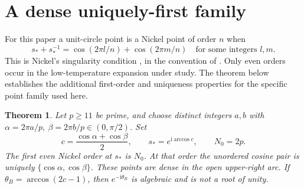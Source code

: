 \documentclass[11pt]{article}
\numberwithin{equation}{section}
\newtheorem{theorem}{Theorem}[section]
\theoremstyle{definition}
\newcommand{\ii}{\mathrm i}
\newcommand{\sstar}{s_*}
\begin{document}
\section{A dense uniquely-first family}
\label{sec:arithmetic}
For this paper a unit-circle point is a Nickel point of order \(n\)
when
\[
 s_*+s_*^{-1}
   =\cos(2\pi l/n)+\cos(2\pi m/n)
 \quad\text{for some integers }l,m.
\]
This is Nickel's singularity condition
\cite{Nickel1999,Nickel2000}, in the convention of \cite{TW2014}.
Only even orders occur in the low-temperature expansion under study.
The theorem below establishes the additional first-order and uniqueness
properties for the specific point family used here.
\begin{theorem}\label{thm:prime}
Let \(p\ge11\) be prime, and choose distinct integers \(a,b\) with
\(\alpha=2\pi a/p,\ \beta=2\pi b/p\in(0,\pi/2)\).
Set
\[
 c=\frac{\cos\alpha+\cos\beta}{2},\qquad
 \sstar=e^{\ii\arccos c},\qquad N_0=2p.
\]
The first even Nickel order at \(\sstar\) is \(N_0\).
At that order the unordered cosine pair is uniquely
\(\{\cos\alpha,\cos\beta\}\).
These points are dense in the open upper-right arc.
If \(\theta_B=\arccos(2c-1)\), then \(e^{-\ii\theta_B}\) is algebraic
and is not a root of unity.
\end{theorem}
\end{document}
